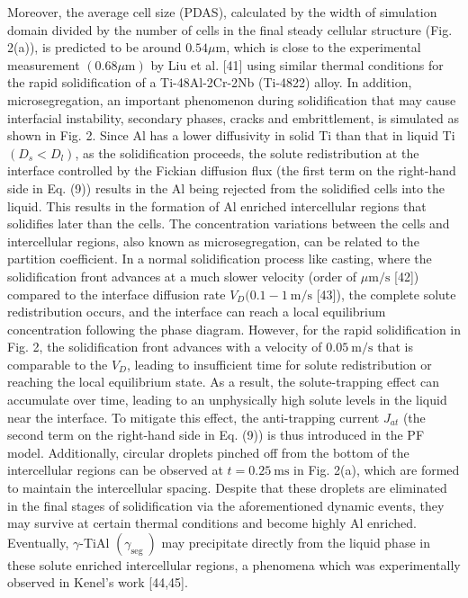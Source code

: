 \documentclass[10pt]{article}
\begin{document}
Moreover, the average cell size (PDAS), calculated by the width of simulation domain divided by the number of cells in the final steady cellular structure (Fig. 2(a)), is predicted to be around $0.54 \mu \mathrm{m}$, which is close to the experimental measurement $(0.68 \mu \mathrm{m})$ by Liu et al. [41] using similar thermal conditions for the rapid solidification of a Ti-48Al-2Cr-2Nb (Ti-4822) alloy. In addition, microsegregation, an important phenomenon during solidification that may cause interfacial instability, secondary phases, cracks and embrittlement, is simulated as shown in Fig. 2. Since Al has a lower diffusivity in solid Ti than that in liquid Ti $\left(D_{s}<D_{l}\right)$, as the solidification proceeds, the solute redistribution at the interface controlled by the Fickian diffusion flux (the first term on the right-hand side in Eq. (9)) results in the $\mathrm{Al}$ being rejected from the solidified cells into the liquid. This results in the formation of $\mathrm{Al}$ enriched intercellular regions that solidifies later than the cells. The concentration variations between the cells and intercellular regions, also known as microsegregation, can be related to the partition coefficient. In a normal solidification process like casting, where the solidification front advances at a much slower velocity (order of $\mu \mathrm{m} / \mathrm{s}$ [42]) compared to the interface diffusion rate $V_{D}(0.1-1 \mathrm{~m} / \mathrm{s}$ [43]), the complete solute redistribution occurs, and the interface can reach a local equilibrium\\
concentration following the phase diagram. However, for the rapid solidification in Fig. 2, the solidification front advances with a velocity of $0.05 \mathrm{~m} / \mathrm{s}$ that is comparable to the $V_{D}$, leading to insufficient time for solute redistribution or reaching the local equilibrium state. As a result, the solute-trapping effect can accumulate over time, leading to an unphysically high solute levels in the liquid near the interface. To mitigate this effect, the anti-trapping current $J_{a t}$ (the second term on the right-hand side in Eq. (9)) is thus introduced in the PF model. Additionally, circular droplets pinched off from the bottom of the intercellular regions can be observed at $t=0.25 \mathrm{~ms}$ in Fig. 2(a), which are formed to maintain the intercellular spacing. Despite that these droplets are eliminated in the final stages of solidification via the aforementioned dynamic events, they may survive at certain thermal conditions and become highly Al enriched. Eventually, $\gamma$-TiAl $\left(\gamma_{\text {seg }}\right)$ may precipitate directly from the liquid phase in these solute enriched intercellular regions, a phenomena which was experimentally observed in Kenel's work [44,45].
\end{document}

